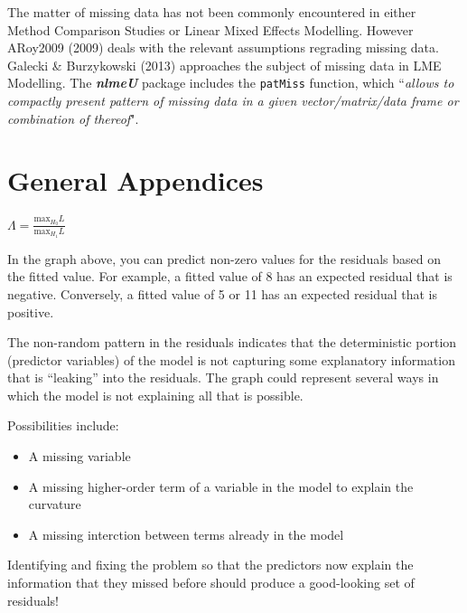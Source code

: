 \documentclass[12pt, a4paper]{report}
\theoremstyle{plain}
\theoremstyle{definition}
\theoremstyle{remark}
\begin{document}
	The matter of missing data has not been commonly encountered in either Method Comparison Studies or Linear Mixed Effects Modelling. However ARoy2009 (2009) deals with the relevant assumptions regrading missing data. Galecki \& Burzykowski (2013) approaches the subject of missing data in LME Modelling. The \textbf{\textit{nlmeU}} package includes the \texttt{patMiss} function, which ``\textit{allows to compactly present pattern of missing data in a given vector/matrix/data
		frame or combination of thereof}".
	
	
	
	\chapter{General Appendices}
	$\Lambda = \frac{\mbox{max}_{H_{0}}L}{\mbox{max}_{H_{1}}L}$
	
	
	
	
	In the graph above, you can predict non-zero values for the residuals based on the fitted value. For example, a fitted value of 8 has an expected residual that is negative. Conversely, a fitted value of 5 or 11 has an expected residual that is positive.
	
	The non-random pattern in the residuals indicates that the deterministic portion (predictor variables) of the model is not capturing some explanatory information that is “leaking” into the residuals. The graph could represent several ways in which the model is not explaining all that is possible. 
	
	Possibilities include:
	
	\begin{itemize}
		\item A missing variable
		\item A missing higher-order term of a variable in the model to explain the curvature
		\item A missing interction between terms already in the model
	\end{itemize}
	
	
	Identifying and fixing the problem so that the predictors now explain the information that they missed before should produce a good-looking set of residuals!
	
\end{document}
